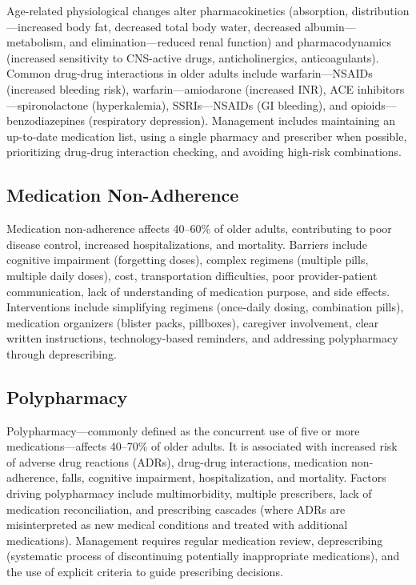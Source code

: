 Age-related physiological changes alter pharmacokinetics (absorption, distribution---increased body fat, decreased total body water, decreased albumin---metabolism, and elimination---reduced renal function) and pharmacodynamics (increased sensitivity to CNS-active drugs, anticholinergics, anticoagulants). Common drug-drug interactions in older adults include warfarin---NSAIDs (increased bleeding risk), warfarin---amiodarone (increased INR), ACE inhibitors---spironolactone (hyperkalemia), SSRIs---NSAIDs (GI bleeding), and opioids---benzodiazepines (respiratory depression). Management includes maintaining an up-to-date medication list, using a single pharmacy and prescriber when possible, prioritizing drug-drug interaction checking, and avoiding high-risk combinations.

\subsection{Medication Non-Adherence}
\label{sec:Medication Non-Adherence}

Medication non-adherence affects 40--60\% of older adults, contributing to poor disease control, increased hospitalizations, and mortality. Barriers include cognitive impairment (forgetting doses), complex regimens (multiple pills, multiple daily doses), cost, transportation difficulties, poor provider-patient communication, lack of understanding of medication purpose, and side effects. Interventions include simplifying regimens (once-daily dosing, combination pills), medication organizers (blister packs, pillboxes), caregiver involvement, clear written instructions, technology-based reminders, and addressing polypharmacy through deprescribing.

\subsection{Polypharmacy}
\label{sec:Polypharmacy}

Polypharmacy---commonly defined as the concurrent use of five or more medications---affects 40--70\% of older adults. It is associated with increased risk of adverse drug reactions (ADRs), drug-drug interactions, medication non-adherence, falls, cognitive impairment, hospitalization, and mortality. Factors driving polypharmacy include multimorbidity, multiple prescribers, lack of medication reconciliation, and prescribing cascades (where ADRs are misinterpreted as new medical conditions and treated with additional medications). Management requires regular medication review, deprescribing (systematic process of discontinuing potentially inappropriate medications), and the use of explicit criteria to guide prescribing decisions.

